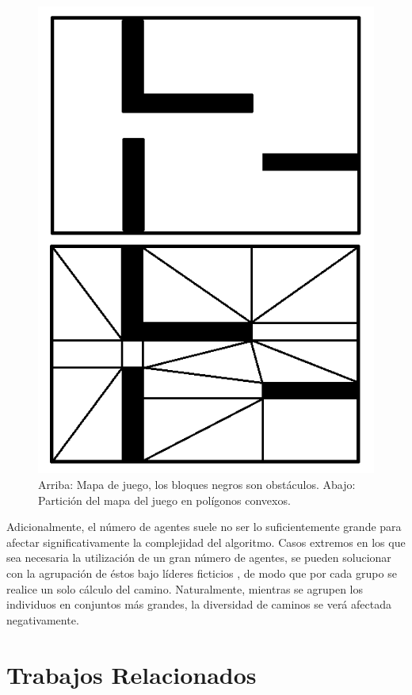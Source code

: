 \documentclass{egpubl}
\begin{document}
\begin{figure}[htb]
	\begin{center}
		\includegraphics[scale=0.4]{graph_decomposition.png}
	\end{center}
	\caption{\label{fig:graph_decomp}
	     Arriba: Mapa de juego, los bloques negros son obstáculos.
	     Abajo: Partición del mapa del juego en polígonos convexos.}
\end{figure}

Adicionalmente, el número de agentes suele no ser
lo suficientemente grande para afectar significativamente
la complejidad del algoritmo. Casos extremos en los que
sea necesaria la utilización de un gran número de agentes,
se pueden solucionar con la agrupación de éstos bajo líderes
ficticios \cite{MF09}, de modo que por cada grupo se realice un solo
cálculo del camino. Naturalmente, mientras se agrupen los
individuos en conjuntos más grandes, la diversidad de
caminos se verá afectada negativamente.
\section{Trabajos Relacionados}
\end{document}
